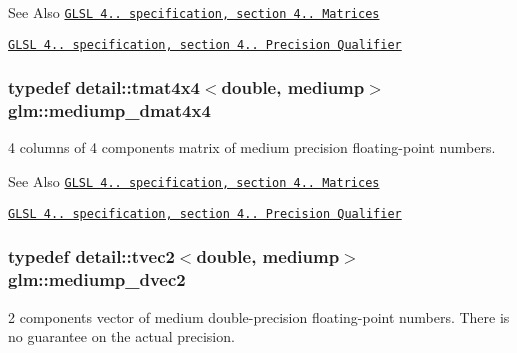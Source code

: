 \begin{DoxySeeAlso}{See Also}
\href{http://www.opengl.org/registry/doc/GLSLangSpec.4.20.8.pdf}{\tt G\-L\-S\-L 4.. specification, section 4.. Matrices} 

\href{http://www.opengl.org/registry/doc/GLSLangSpec.4.20.8.pdf}{\tt G\-L\-S\-L 4.. specification, section 4.. Precision Qualifier} 
\end{DoxySeeAlso}
\hypertarget{group__core__precision_gad64329d45b05417ccf0cc3c23f584d26}{
\subsubsection[{mediump\-\_\-dmat4x4}]{\setlength{\rightskip}{0pt plus 5cm}typedef detail\-::tmat4x4$<$double, mediump$>$ {\bf glm\-::mediump\-\_\-dmat4x4}}}\label{group__core__precision_gad64329d45b05417ccf0cc3c23f584d26}
4 columns of 4 components matrix of medium precision floating-\/point numbers.

\begin{DoxySeeAlso}{See Also}
\href{http://www.opengl.org/registry/doc/GLSLangSpec.4.20.8.pdf}{\tt G\-L\-S\-L 4.. specification, section 4.. Matrices} 

\href{http://www.opengl.org/registry/doc/GLSLangSpec.4.20.8.pdf}{\tt G\-L\-S\-L 4.. specification, section 4.. Precision Qualifier} 
\end{DoxySeeAlso}
\hypertarget{group__core__precision_gace1f1cc2eb8e978dcb60e682af87b541}{
\subsubsection[{mediump\-\_\-dvec2}]{\setlength{\rightskip}{0pt plus 5cm}typedef detail\-::tvec2$<$double, mediump$>$ {\bf glm\-::mediump\-\_\-dvec2}}}\label{group__core__precision_gace1f1cc2eb8e978dcb60e682af87b541}
2 components vector of medium double-\/precision floating-\/point numbers. There is no guarantee on the actual precision.

